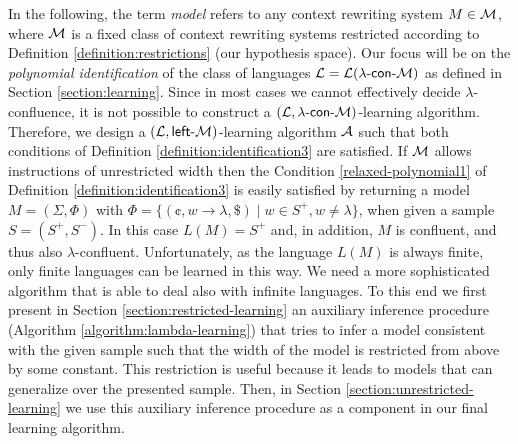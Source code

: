 In the following, the term \emph{model} refers to any context rewriting system $M \in \textup{\sf $\mathcal{M}$}$, where $\textup{\sf $\mathcal{M}$}$ is a fixed class of context rewriting systems restricted according to Definition \ref{definition:restrictions} (our hypothesis space). Our focus will be on the \emph{polynomial identification} of the class of languages $\textup{\sf $\mathcal{L}$} = {\cal L}(\textup{\sf $\lambda$-con-\textup{\sf $\mathcal{M}$}})$ as defined in Section \ref{section:learning}. Since in most cases we cannot effectively decide $\lambda$-confluence, it is not possible to construct a $(\textup{\sf $\mathcal{L}$}, \textup{\sf $\lambda$-con-\textup{\sf $\mathcal{M}$}})$-learning algorithm. Therefore, we design a $(\textup{\sf $\mathcal{L}$}, \textup{\sf left-\textup{\sf $\mathcal{M}$}})$-learning algorithm $\textup{\sf $\mathcal{A}$}$ such that both conditions of Definition \ref{definition:identification3} are satisfied. If $\textup{\sf $\mathcal{M}$}$ allows instructions of unrestricted width then the Condition \ref{relaxed-polynomial1} of Definition \ref{definition:identification3} is easily satisfied by returning a model $M = (\Sigma, \Phi)$ with $\Phi = \{ (\cent, w \to \lambda, \$) \mid w \in S^+, w \neq \lambda \}$, when given a sample $S = (S^+, S^-)$. In this case $L(M) = S^+$ and, in addition, $M$ is confluent, and thus also $\lambda$-confluent. Unfortunately, as the language $L(M)$ is always finite, only finite languages can be learned in this way. We need a more sophisticated algorithm that is able to deal also with infinite languages. To this end we first present in Section \ref{section:restricted-learning} an auxiliary inference procedure (Algorithm \ref{algorithm:lambda-learning}) that tries to infer a model consistent with the given sample such that the width of the model is restricted from above by some constant. This restriction is useful because it leads to models that can generalize over the presented sample. Then, in Section \ref{section:unrestricted-learning} we use this auxiliary inference procedure as a component in our final learning algorithm.

